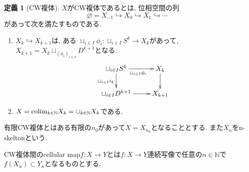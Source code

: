 \documentclass[dvipdfmx,a4paper,11pt]{article}
\newcommand{\N}{\mathbb{N}}
\newcommand{\colim}{{\rm colim}}
\theoremstyle{definition}
\newtheorem{dfn}[thm]{定義}
\begin{document}
 \begin{tcolorbox}
 [colback = white, colframe = green!35!black, fonttitle = \bfseries,breakable = true]
\begin{dfn}[CW複体]
$X$がCW複体であるとは, 位相空間の列
$$
\varnothing = X_{-1} \hookrightarrow X_{0}\hookrightarrow X_{1}\hookrightarrow \cdots
$$
があって次を満たすものである. 
\begin{enumerate}
\item $X_{k} \hookrightarrow X_{k+1}$は, ある $\sqcup_{i \in I} \phi_i : \sqcup_{i \in I} S^{k} \to X_{k}$があって, $X_{k+1} = X_{k} \sqcup_{(\phi_i)_{i \in I}} D^{k+1} $となる. 
\begin{equation*}
\xymatrix@C=25pt@R=20pt{
\sqcup_{i \in I} S^{k}  \ar@{->}[r]_{\sqcup_{i \in I} \phi_i } \ar@{->}[d]_{\sqcup_{i \in I}i_{k}}&X_k \ar@{->}[d]\\
 \sqcup_{i \in I} D^{k+1}  \ar@{->}[r] &X_{k+1} \\   
}
\end{equation*}
\item $X = \colim_{k \in \N} X_k = \cup_{k \in \N} X_k$である. 
\end{enumerate}

有限CW複体とはある有限の$n_0$があって$X = X_{n_0}$となることとする.
また$X_n$をn-skeltonという. 

CW複体間のcellular map$f : X \to Y$とは$f : X \to Y$連続写像で任意の$n \in \N$で$f(X_n) \subset  Y_n$となるものとする. 
\end{dfn}
\end{tcolorbox}

\end{document}
